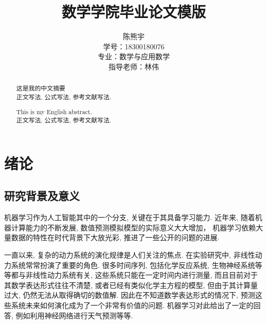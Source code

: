 \documentclass[notitlepage,cs4size,punct,oneside]{ctexrep}
\title{{\zihao{1}\heiti{} 数学学院毕业论文模版}}
\author{陈熊宇\\学号：18300180076\\专业：数学与应用数学\\指导老师：林伟}
\date{}
\numberwithin{equation}{chapter}
\theoremstyle{mystyle}
\begin{document}
\CTEXoptions[contentsname={\heiti{目\ \ \ \ \ \ 录}}]
\CTEXoptions[abstractname={摘要：}]
\CTEXoptions[bibname={\heiti 参考文献}]

\renewcommand{\thepage}{\roman{page}}

\setcounter{page}{0}

\tableofcontents


\maketitle\renewcommand{\thepage}{\arabic{page}}
\thispagestyle{empty}\setcounter{page}{0}

\renewcommand{\abstractname}{摘要}
\begin{abstract}
这是我的中文摘要\\
 正文写法, 公式写法, 参考文献写法.
\end{abstract}
\renewcommand{\abstractname}{Abstract}
\begin{abstract}
This is my English abstract.\\
 正文写法, 公式写法, 参考文献写法.
\end{abstract}


\chapter{绪论}

\section{研究背景及意义}

机器学习作为人工智能其中的一个分支, 关键在于其具备学习能力. 
近年来, 随着机器计算能力的不断发展, 数值预测模拟模型的实际意义大大增加，
机器学习依赖大量数据的特性在时代背景下大放光彩, 推进了一些公开的问题的进展. 

一直以来, 复杂的动力系统的演化规律是人们关注的焦点. 
在实验研究中, 非线性动力系统常常扮演了重要的角色. 
很多时间序列, 包括化学反应系统, 生物神经系统等等都与非线性动力系统有关,
这些系统只能在一定时间内进行测量, 而且目前对于其数学表达形式往往不清楚, 
或者已经有类似化学主方程的模型, 但由于其计算量过大, 仍然无法从取得确切的数值解. 
因此在不知道数学表达形式的情况下, 预测这些系统未来如何演化成为了一个非常有价值的问题.
机器学习对此给出了一定的回答, 例如利用神经网络进行天气预测\cite{VKMF}等等. 
\end{document}
